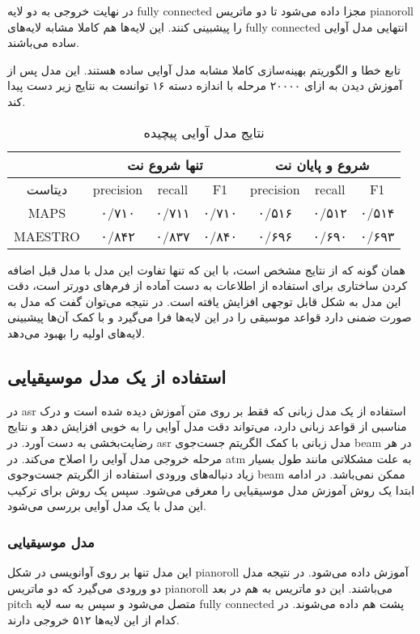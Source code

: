 در نهایت خروجی به دو لایه \gls{fully connected} مجزا داده می‌شود تا دو ماتریس
\gls{pianoroll} را پیشبینی کنند. این لایه‌ها هم کاملا مشابه لایه‌های \gls{fully
connected} انتهایی مدل آوایی ساده می‌باشند.

تابع خطا و الگوریتم بهینه‌سازی کاملا مشابه مدل آوایی ساده هستند. این مدل پس از
آموزش دیدن به ازای ۲۰۰۰۰ مرحله با اندازه دسته ۱۶ توانست به نتایج زیر دست پیدا
کند.
\begin{table}[ht]
    \centering
    \begin{tabular}{|c|c|c|c|c|c|c|}
        \hline
        & \multicolumn{3}{|c|}{تنها شروع نت} & \multicolumn{3}{|c|}{شروع و پایان نت} \\
        \hline
        دیتاست & \gls{precision} & \gls{recall} & F1 & \gls{precision} & \gls{recall} & F1 \\
        \hline
        MAPS & ۰/۷۱۰ & ۰/۷۱۱ & ۰/۷۱۰ & ۰/۵۱۶ & ۰/۵۱۲ & ۰/۵۱۴ \\
        \hline
        MAESTRO & ۰/۸۴۲ & ۰/۸۳۷ & ۰/۸۴۰ & ۰/۶۹۶ & ۰/۶۹۰ & ۰/۶۹۳ \\
        \hline
    \end{tabular}
    \caption{نتایج مدل آوایی پیچیده}
\end{table}

همان گونه که از نتایج مشخص است، با این که تنها تفاوت این مدل با مدل قبل اضافه
کردن ساختاری برای استفاده از اطلاعات به دست آماده از فرم‌های دورتر است، دقت این
مدل به شکل قابل توجهی افزایش یافته است. در نتیجه می‌توان گفت که مدل به صورت ضمنی
دارد قواعد موسیقی را در این لایه‌ها فرا می‌گیرد و با کمک آن‌ها پیشبینی لایه‌های
اولیه را بهبود می‌دهد.

\subsection{استفاده از یک مدل موسیقیایی}
در \gls{asr} استفاده از یک مدل زبانی که فقط بر روی متن آموزش دیده شده است و درک
مناسبی از قواعد زبانی دارد، می‌تواند دقت مدل آوایی را به خوبی افزایش دهد و نتایج
رضایت‌بخشی به دست آورد. در \gls{asr} مدل زبانی با کمک الگریتم جست‌جوی beam در هر
مرحله خروجی مدل آوایی را اصلاح می‌کند. در \gls{atm} به علت مشکلاتی مانند طول
بسیار زیاد دنباله‌های ورودی استفاده از الگریتم جست‌وجوی beam ممکن نمی‌باشد. در
ادامه ابتدا یک روش آموزش مدل موسیقیایی را معرفی می‌شود. سپس یک روش برای ترکیب
این مدل با یک مدل آوایی بررسی می‌شود.

\subsubsection{مدل موسیقیایی}
این مدل تنها بر روی آوانویسی در شکل \gls{pianoroll} آموزش داده می‌شود. در نتیجه
مدل دو ورودی می‌گیرد که دو ماتریس \gls{pianoroll} می‌باشند. این دو ماتریس به هم
در بعد \gls{pitch} متصل می‌شود و سپس به سه لایه \gls{fully connected} پشت هم
داده می‌شوند. در کدام از این لایه‌ها ۵۱۲ خروجی دارند.

